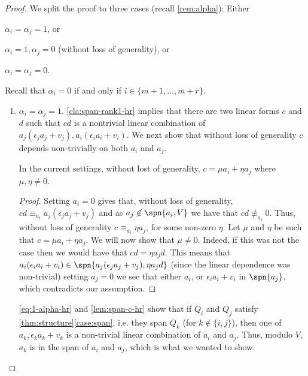 \begin{proof}


We split the proof to three cases (recall \autoref{rem:alpha}): Either 
\begin{enumerate*}[label=(\roman*)]
  \item $\alpha_i = \alpha_j = 1$, or 
  \item $\alpha_i = 1, \alpha_j = 0$ (without loss of generality), or
  \item $\alpha_i=\alpha_j = 0$.
\end{enumerate*} 
Recall that $\alpha_i=0$ if and only if $i\in\{m+1,\ldots,m+r\}$. 

\begin{enumerate}[label=(\roman*)]
	\item  $\alpha_i= \alpha_j = 1$. 	
\autoref{cla:span-rank1-hr} implies that there are two linear forms $c$ and $d$ such that $cd$ is a nontrivial linear combination of ${a_j(\epsilon_j a_j + v_j), a_i(\epsilon_i a_i + v_i)}$. We next show that  without loss of generality $c$ depends non-trivially on both $a_i$ and $a_j$.

\begin{lemma}\label{lem:span-c-hr}
In the current settings, without lost of generality, $c= \mu a_i + \eta a_j$ where $\mu,\eta \neq 0$.
\end{lemma}
\begin{proof}

Setting $a_i=0$ gives that, without loss of generality, $cd \equiv_{a_i} a_j(\epsilon_j a_j + v_j)$ and as $a_j\not\in \spn{a_i,V}$ we have that $cd\not\equiv_{a_i}0$. Thus,  without loss of generality $c \equiv_{a_i} \eta a_j$, for some non-zero $\eta$. Let $\mu$ and $\eta$ be such that  $c = \mu a_i + \eta a_j$. We will now show that $\mu  \neq 0$. Indeed, if this was not the case then we would have that $cd = \eta a_j d$.
This means that $ a_i(\epsilon_i a_i + v_i) \in \spn{a_j(\epsilon_j a_j + v_j), \eta a_j d}$ (since the linear dependence was non-trivial) setting $a_j =0$ we see that either $a_i$, or $ \epsilon_i a_i + v_i$ in $\spn{a_j}$, which contradicts our assumption. 

\end{proof}


\autoref{eq:1-alpha-hr} and \autoref{lem:span-c-hr} show that if $Q_i$ and $Q_j$ satisfy \autoref{thm:structure}\ref{case:span}, i.e. they span $Q_k$ (for $k\not\in\{i,j\}$), then one of $a_k,\epsilon_k a_k + v_k$ is a non-trivial linear combination of $a_i$ and $a_j$. Thus, modulo $V$, $a_k$ is in the span of $a_i$ and $a_j$, which is what we wanted to show. 
	

\end{enumerate}
\end{proof}
